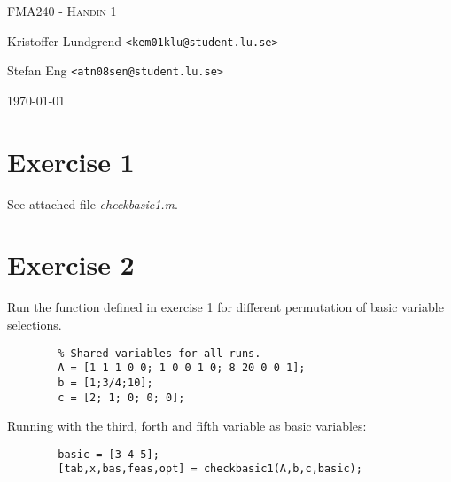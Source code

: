 \documentclass{article}
\begin{document}
\begin{titlepage}
	\centering
	{\scshape\Large FMA240 - Handin 1\par}
	\vspace{1cm}
	Kristoffer Lundgrend \texttt{<kem01klu@student.lu.se>}\par
	Stefan Eng \texttt{<atn08sen@student.lu.se>}\par
    \vspace{1cm}
	\today\par
\end{titlepage}

\newcommand\encircle[1]{%
  \tikz[baseline=(X.base)]
    \node (X) [draw, shape=circle, inner sep=0] {\strut #1};}



\section*{Exercise 1}

    See attached file \textit{checkbasic1.m}.

\section*{Exercise 2}

    Run the function defined in exercise 1 for different permutation of
    basic variable selections.

    \begin{lstlisting}
        % Shared variables for all runs.
        A = [1 1 1 0 0; 1 0 0 1 0; 8 20 0 0 1];
        b = [1;3/4;10];
        c = [2; 1; 0; 0; 0];
    \end{lstlisting}

    Running with the third, forth and fifth variable as basic variables:

    \begin{lstlisting}
        basic = [3 4 5];
        [tab,x,bas,feas,opt] = checkbasic1(A,b,c,basic);
    \end{lstlisting}
\end{document}

